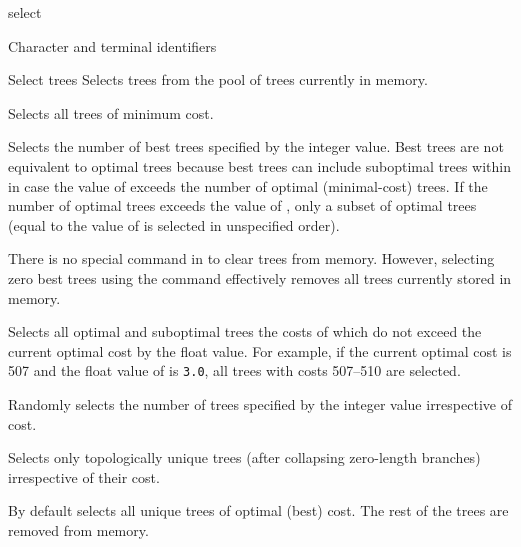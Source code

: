 \begin{command}{select}{}
\begin{arguments}
\begin{argumentgroup}{Character and terminal identifiers}
          
        \end{argumentgroup}

		\begin{argumentgroup}{Select trees}
			{Selects trees from the pool of trees currently in memory.}

				{Selects all trees of minimum cost.} 
                			{}
			
				{Selects the number of best trees specified by the integer value.
				Best trees are not equivalent to optimal trees because best trees
				can include suboptimal trees within in case the value of
				 exceeds the number of optimal (minimal-cost)
				trees. If the number of optimal trees exceeds the value of
				, only a subset of optimal trees (equal to the
				value of  is selected in unspecified order).} 
                			{}
	
	\begin{statement}
               There is no special command in \poy to clear trees from memory. However,
               selecting zero best trees using the command 
               effectively removes all trees currently stored in memory.
          \end{statement}
            
                {Selects all optimal and suboptimal trees the costs of which do not exceed
                the current optimal cost by the float value. For example, if the current
                optimal cost is 507 and the float value of  is
                \texttt{3.0}, all trees with costs 507--510 are selected.} 
                {}

	{Randomly selects the number of trees specified by the integer
	value irrespective of cost.} 
                {}

	{Selects only topologically unique trees (after collapsing zero-length
	branches) irrespective of their cost.} 
                {}

		\end{argumentgroup}
	
	\end{arguments}
	 	 	 	 	  
        {By default \poy selects all unique trees of optimal (best) cost. The rest of
        the trees are removed from memory.}


\end{command}
